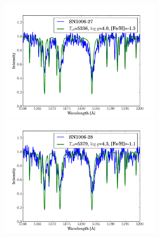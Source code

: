 \begin{figure}[htbp]
   \label{fig:sn1006_candfit}
\end{figure}\begin{figure}[htbp] %
   \centering
\includegraphics[width=0.7\textwidth, trim=0 0mm 0 10mm, clip]{chapter_sn1006/plots/gold_spectra/sn1006_27.pdf}
\includegraphics[width=0.7\textwidth, trim=0 0mm 0 10mm, clip]{chapter_sn1006/plots/gold_spectra/sn1006_28.pdf}

   \label{fig:sn1006_candfit}
\end{figure}